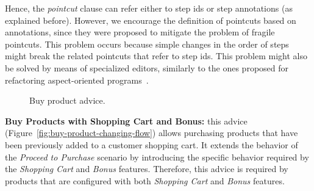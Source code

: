 \documentclass{acm_proc_article-sp}
\begin{document}
{\color{red} Hence, the \emph{pointcut} clause can refer either to step ids or step annotations (as explained before). However, we encourage the definition 
of pointcuts based on annotations, since they were proposed to mitigate the problem of fragile pointcuts. 
This problem occurs because simple changes in the order of steps might break the related pointcuts that refer to step ids. This 
problem might also be solved by means of specialized editors, similarly to the ones proposed for refactoring aspect-oriented programs~\cite{Wloka:2008aa}.}
 
\begin{figure}[h]
\caption{Buy product advice.}
\label{fig:buy-product-scenario}
\end{figure}

{\bf Buy Products with Shopping Cart and Bonus:} this advice
(Figure~\ref{fig:buy-product-changing-flow}) allows purchasing products
that have been previously added to a customer shopping cart. It extends the
behavior of the \emph{Proceed to Purchase} scenario by introducing the specific
behavior required by the \emph{Shopping Cart} and
\emph{Bonus} features. Therefore, this advice is required by products that
are configured with both \emph{Shopping Cart} and \emph{Bonus} features.
\end{document}
